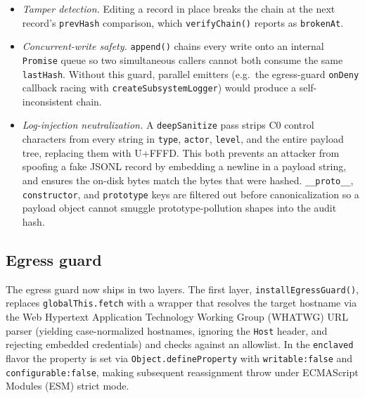 \documentclass[11pt]{article}
\begin{document}
\begin{itemize}
  \item \emph{Tamper detection.} Editing a record in place breaks the
    chain at the next record's \texttt{prevHash} comparison, which
    \texttt{verifyChain()} reports as \texttt{brokenAt}.
  \item \emph{Concurrent-write safety.} \texttt{append()} chains every
    write onto an internal \texttt{Promise} queue so two simultaneous
    callers cannot both consume the same \texttt{lastHash}. Without this
    guard, parallel emitters (e.g.\ the egress-guard \texttt{onDeny}
    callback racing with \texttt{createSubsystemLogger}) would produce a
    self-inconsistent chain.
  \item \emph{Log-injection neutralization.} A \texttt{deepSanitize}
    pass strips C0 control characters from every string in
    \texttt{type}, \texttt{actor}, \texttt{level}, and the entire
    payload tree, replacing them with U+FFFD. This both prevents an
    attacker from spoofing a fake JSONL record by embedding a newline in
    a payload string, and ensures the on-disk bytes match the bytes
    that were hashed. \texttt{\_\_proto\_\_}, \texttt{constructor}, and
    \texttt{prototype} keys are filtered out before canonicalization so
    a payload object cannot smuggle prototype-pollution shapes into the
    audit hash.
\end{itemize}

\subsection{Egress guard}
\label{sec:egress}

The egress guard now ships in two layers. The first layer,
\texttt{installEgressGuard()}, replaces \texttt{globalThis.fetch} with
a wrapper that resolves the target hostname via the Web Hypertext
Application Technology Working Group (WHATWG) URL parser (yielding
case-normalized hostnames, ignoring the \texttt{Host} header, and
rejecting embedded credentials) and checks against an allowlist. In
the \texttt{enclaved} flavor the property is set via
\texttt{Object.defineProperty} with \texttt{writable:false} and
\texttt{configurable:false}, making subsequent reassignment throw
under ECMAScript Modules (ESM) strict mode.
\end{document}
